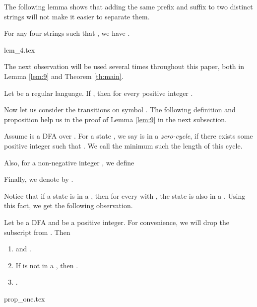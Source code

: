 \documentclass[preprint, 12pt]{elsarticle}
\begin{document}
	
	
	The following lemma shows that adding the same prefix and suffix to two distinct strings will not make it easier to separate them. 
	\begin{lemma}
		\label{lem:4}
		For any four strings  such that , we have .
	\end{lemma}
	{lem_4.tex}
	
	The next observation will be used several times throughout this paper, both in Lemma \ref{lem:9} and Theorem \ref{th:main}.
	\begin{proposition}
		\label{prp:five}
		Let  be a regular language. If , then  for every positive integer .
	\end{proposition}	
	
	Now let us consider the transitions on symbol . The following definition and proposition help us in the proof of Lemma \ref{lem:9} in the next subsection.
	\begin{definition}
		Assume  is a DFA over . For a state , 
		we say  is in a \textit{zero-cycle}, if there exists some positive integer  such that . We call the minimum such  the length of this cycle.  
		 
	
		 Also, for a non-negative integer , we define 
		 
		  Finally, we denote  by .

	\end{definition}
	
	Notice that if a state  is in a \zcycle,
	then for every  with , the state  is also in a \zcycle.
	Using this fact, we get the following observation.
	
	\begin{proposition}
		\label{prp:one}
		 Let  be a DFA and  be a positive integer. For convenience, we will drop the subscript  from . Then
		 \begin{enumerate}[label=(\alph*)]
		 	\item 
		 	\label{st:a}
		 		 and .
		 	\item  
		 	\label{st:b}
		 		If  is not in a \zcycle, then .
		 	\item 
		 	\label{st:c}
		 		.
		 \end{enumerate}
	\end{proposition}
	{prop_one.tex}
		
	
\end{document}
